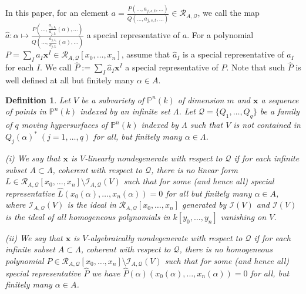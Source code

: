 \documentclass[12pt,leqno]{amsart}
\newtheorem{definition}[equation]{Definition}
\numberwithin{equation}{section}
\begin{document}
 In this paper, for an element $a=\frac{P\left(\ldots,a_{j,s,t},\ldots\right)}{Q\left(\ldots,a_{j,s,t},\ldots\right)}\in\mathcal{R}_{A,\mathcal{Q}}$, we call the map $\widehat{a}:\alpha\mapsto\frac{P\left(\ldots,\frac{a_{j,I_{s}}}{a_{j,I_{t}}}(\alpha),\ldots\right)}{Q\left(\ldots,\frac{a_{j, I_{s}}}{a_{j, I_{t}}}(\alpha), \ldots\right)}$ a special representative of $a$. For a polynomial $P=\sum_{I}a_{I}\mathbf{x}^{I}\in\mathcal{R}_{A, \mathcal{Q}}\left[x_0,\ldots,x_n\right]$, assume that $\widehat{a}_{I}$ is a special representative of $a_{I}$ for each $I$. We call $\widehat{P}:=\sum_{I}\widehat{a}_{I}\mathbf{x}^{I}$ a special representative of $P$. Note that such $\widehat{P}$ is well defined at all but finitely many $\alpha\in A$.

\begin{definition}\label{2.1} Let $V$ be a subvariety of $\mathbb P^n(k)$ of dimension $m$ and $\mathbf{x}$ a sequence of points in $\mathbb{P}^{n}(k)$ indexed by an infinite set $\Lambda$. Let $\mathcal Q=\{Q_{1}, \ldots, Q_{q}\}$ be a family of $q$ moving hypersurfaces of $\mathbb P^n(k)$ indexed by $\Lambda$ such that $V$ is not contained in $Q_j(\alpha)^*\; ( j=1,\dots, q)$ for all, but finitely many $\alpha\in\Lambda$. 

(i) We say that $\mathbf{x}$ is $V$-linearly nondegenerate with respect to $\mathcal{Q}$ if for each infinite subset $A\subset \Lambda$, coherent with respect to $\mathcal Q$, there is no linear form $L\in\mathcal R_{A,\mathcal Q}[x_0,\dots,x_n]\setminus\mathcal I_{A,\mathcal Q}(V)$ such that for some (and hence all) special representative $\widehat{L}\left(x_{0}(\alpha),\ldots,x_n(\alpha)\right)=0$ for all but finitely many $\alpha\in A$, where $\mathcal I_{A,\mathcal Q}(V)$ is the ideal in $\mathcal R_{A, \mathcal Q}[x_0,\dots,x_n]$ generated by $\mathcal I(V)$ and $\mathcal I(V)$ is the ideal of all homogeneous polynomials in $k[y_0,\ldots,y_n]$ vanishing on $V$.

(ii) We say that $\mathbf{x}$ is $V$-algebraically nondegenerate with respect to $\mathcal Q$ if for each infinite subset $A\subset \Lambda$, coherent with respect to $\mathcal Q$, there is no homogeneous polynomial $P\in \mathcal R_{A,\mathcal Q}[x_0, \dots, x_n] \setminus \mathcal I_{A, \mathcal Q}(V)$  such that for some (and hence all) special  representative $\widehat P$ we have $\widehat P(\alpha)(x_0(\alpha), \dots, x_n(\alpha)) =0$ for all, but finitely many $\alpha\in A$. 
\end{definition}
\end{document}

